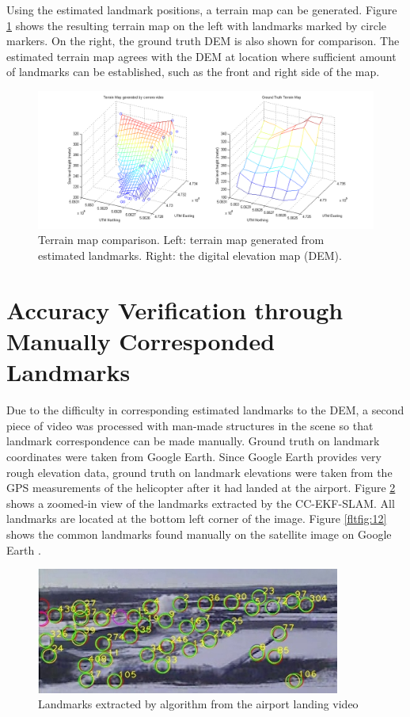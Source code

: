 Using the estimated landmark positions, a terrain map can be
generated. Figure \ref{fltfig:10} shows the resulting terrain map on
the left with landmarks marked by circle markers. On the right, the
ground truth DEM is also shown for comparison. The estimated terrain
map agrees with the DEM at location where sufficient amount of
landmarks can be established, such as the front and right side of the
map.

\begin{figure}[h]
\centering
\includegraphics[width=14cm, keepaspectratio=true]
{./Figures/fltfig/cut1/terrain/terrain_map_cmp.png}
\caption{Terrain map comparison. Left: terrain map generated from
  estimated landmarks. Right: the digital elevation map (DEM). }
\label{fltfig:10}
\end{figure}
\FloatBarrier

\section{Accuracy Verification through Manually Corresponded Landmarks}
\label{sec:flight-manual}
Due to the difficulty in corresponding estimated landmarks to the DEM,
a second piece of video was processed with man-made
structures in the scene so that landmark correspondence can be made
manually. Ground truth on landmark coordinates were taken from Google
Earth. Since Google Earth provides very rough elevation data,
ground truth on landmark elevations were taken from the GPS measurements of the
helicopter after it had landed at the airport. Figure \ref{fltfig:11}
shows a zoomed-in view of the landmarks extracted by the CC-EKF-SLAM.
All landmarks are located at the bottom left corner of the image.
Figure \ref{fltfig:12} shows the common landmarks found manually on
the satellite image on Google Earth \cite{_google_????}.

\begin{figure}[h]
\centering
\includegraphics[width=10cm, keepaspectratio=true]
{./Figures/fltfig/airport/frame398_landmarks.jpg}
\caption{Landmarks extracted by algorithm from the airport landing video }
\label{fltfig:11}
\end{figure}

